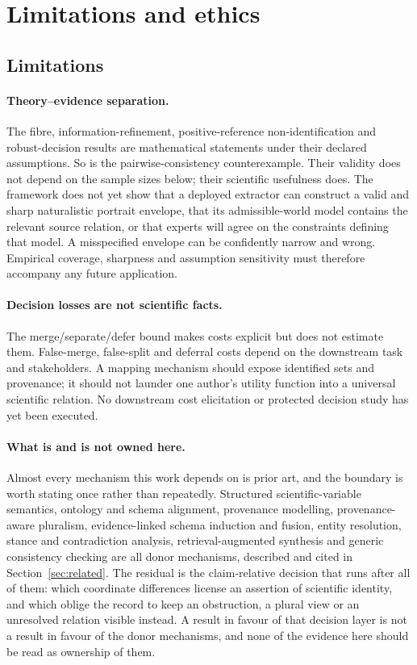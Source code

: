 \section{Limitations and ethics}
\label{sec:limitations}

\subsection{Limitations}

\paragraph{Theory--evidence separation.}
The fibre, information-refinement, positive-reference non-identification and
robust-decision results are mathematical statements under their declared
assumptions. So is the pairwise-consistency counterexample. Their validity does
not depend on the sample sizes below; their scientific usefulness does. The framework does not yet show
that a deployed extractor can construct a valid and sharp naturalistic
portrait envelope, that its admissible-world model contains the relevant
source relation, or that experts will agree on the constraints defining that
model. A misspecified envelope can be confidently narrow and wrong. Empirical
coverage, sharpness and assumption sensitivity must therefore accompany any
future application.

\paragraph{Decision losses are not scientific facts.}
The merge/separate/defer bound makes costs explicit but does not estimate them.
False-merge, false-split and deferral costs depend on the downstream task and
stakeholders. A mapping mechanism should expose identified sets and provenance;
it should not launder one author's utility function into a universal
scientific relation. No downstream cost elicitation or protected decision
study has yet been executed.

\paragraph{What is and is not owned here.}
Almost every mechanism this work depends on is prior art, and the boundary is
worth stating once rather than repeatedly. Structured scientific-variable
semantics, ontology and schema alignment, provenance modelling,
provenance-aware pluralism, evidence-linked schema induction and fusion,
entity resolution, stance and contradiction analysis, retrieval-augmented
synthesis and generic consistency checking are all donor mechanisms, described
and cited in Section~\ref{sec:related}. The residual is the claim-relative
decision that runs after all of them: which coordinate differences license an
assertion of scientific identity, and which oblige the record to keep an
obstruction, a plural view or an unresolved relation visible instead. A result
in favour of that decision layer is not a result in favour of the donor
mechanisms, and none of the evidence here should be read as ownership of them.


